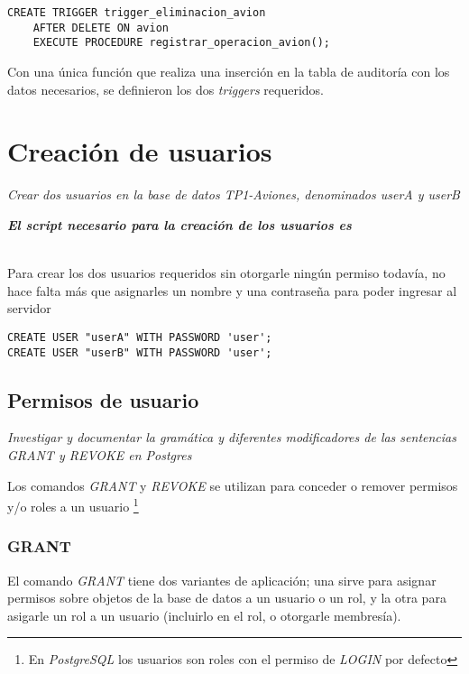 \lstset{style=sql}
\begin{lstlisting}
CREATE TRIGGER trigger_eliminacion_avion 
    AFTER DELETE ON avion
    EXECUTE PROCEDURE registrar_operacion_avion();
\end{lstlisting}

Con una única función que realiza una inserción en la tabla de auditoría con los datos necesarios, se definieron los dos \emph{triggers} requeridos.

\section{Creación de usuarios}
\emph{Crear dos usuarios en la base de datos TP1-Aviones, denominados userA y userB} 

\emph{\textbf{El script necesario para la creación de los usuarios es }} 


~\\

Para crear los dos usuarios requeridos sin otorgarle ningún permiso todavía, no hace falta más que asignarles un nombre y una contraseña para poder ingresar al servidor

\vspace*{5mm}
\lstset{style=sql}
\begin{lstlisting}
CREATE USER "userA" WITH PASSWORD 'user';
CREATE USER "userB" WITH PASSWORD 'user';
\end{lstlisting}

\subsection{Permisos de usuario}
\emph{Investigar y documentar la gramática y diferentes modificadores de las sentencias GRANT y REVOKE en Postgres} 

Los comandos \emph{GRANT} \cite{grant} y \emph{REVOKE} \cite{revoke} se utilizan para conceder o remover permisos y/o roles a un usuario \footnote{En \emph{PostgreSQL} los usuarios son roles con el permiso de \emph{LOGIN} por defecto}   

\subsubsection{GRANT}

El comando \emph{GRANT} tiene dos variantes de aplicación; una sirve para asignar permisos sobre objetos de la base de datos a un usuario o un rol, y la otra para asigarle un rol a un usuario (incluirlo en el rol, o otorgarle membresía).

